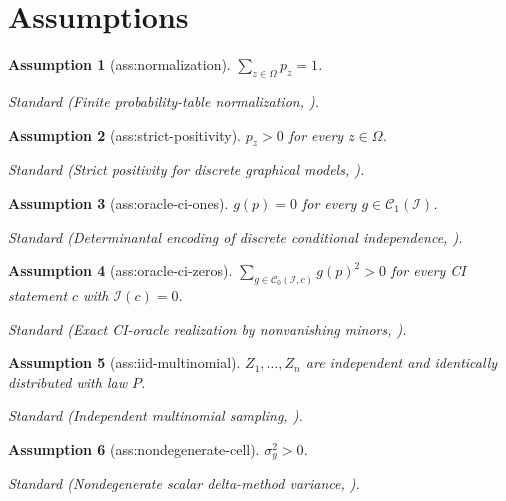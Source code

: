 \documentclass{article}
\newtheorem{assumption}{Assumption}
\begin{document}
\section{Assumptions}

\begin{assumption}[ass:normalization]\label{ass:normalization}
\(\sum_{z\in\Omega}p_z=1\).
\par\smallskip\noindent\emph{Standard} (Finite probability-table normalization, \cite{GarciaStillmanSturmfels2005}).
\end{assumption}

\begin{assumption}[ass:strict-positivity]\label{ass:strict-positivity}
\(p_z>0\) for every \(z\in\Omega\).
\par\smallskip\noindent\emph{Standard} (Strict positivity for discrete graphical models, \cite{GarciaStillmanSturmfels2005}).
\end{assumption}

\begin{assumption}[ass:oracle-ci-ones]\label{ass:oracle-ci-ones}
\(g(p)=0\) for every \(g\in\mathcal C_1(\mathcal I)\).
\par\smallskip\noindent\emph{Standard} (Determinantal encoding of discrete conditional independence, \cite{GarciaStillmanSturmfels2005}).
\end{assumption}

\begin{assumption}[ass:oracle-ci-zeros]\label{ass:oracle-ci-zeros}
\(\sum_{g\in\mathcal C_0(\mathcal I,c)}g(p)^2>0\) for every CI statement \(c\) with \(\mathcal I(c)=0\).
\par\smallskip\noindent\emph{Standard} (Exact CI-oracle realization by nonvanishing minors, \cite{KahleRauhSullivant2017}).
\end{assumption}

\begin{assumption}[ass:iid-multinomial]\label{ass:iid-multinomial}
\(Z_1,\ldots,Z_n\) are independent and identically distributed with law \(P\).
\par\smallskip\noindent\emph{Standard} (Independent multinomial sampling, \cite{DuarteEtAl2024Autobounds}).
\end{assumption}

\begin{assumption}[ass:nondegenerate-cell]\label{ass:nondegenerate-cell}
\(\sigma_y^2>0\).
\par\smallskip\noindent\emph{Standard} (Nondegenerate scalar delta-method variance, \cite{ChangGuoMalinsky2024}).
\end{assumption}
\end{document}
